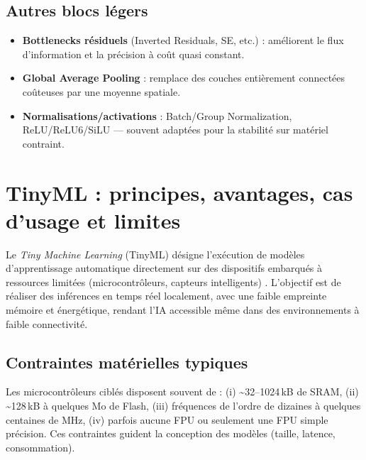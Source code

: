 \subsection{Autres blocs légers}
\begin{itemize}
    \item \textbf{Bottlenecks résiduels} (Inverted Residuals, SE, etc.) : améliorent le flux d’information et la précision à coût quasi constant.
    \item \textbf{Global Average Pooling} : remplace des couches entièrement connectées coûteuses par une moyenne spatiale.
    \item \textbf{Normalisations/activations} : Batch/Group Normalization, ReLU/ReLU6/SiLU — souvent adaptées pour la stabilité sur matériel contraint.
\end{itemize}

\section{TinyML : principes, avantages, cas d’usage et limites}
Le \textit{Tiny Machine Learning} (TinyML) désigne l’exécution de modèles d’apprentissage automatique directement sur des dispositifs embarqués à ressources limitées (microcontrôleurs, capteurs intelligents) \cite{banbury2021}. L’objectif est de réaliser des inférences en temps réel localement, avec une faible empreinte mémoire et énergétique, rendant l’IA accessible même dans des environnements à faible connectivité.

\subsection{Contraintes matérielles typiques}
Les microcontrôleurs ciblés disposent souvent de : (i) \textasciitilde32–1024\,kB de SRAM, (ii) \textasciitilde128\,kB à quelques Mo de Flash, (iii) fréquences de l’ordre de dizaines à quelques centaines de MHz, (iv) parfois aucune FPU ou seulement une FPU simple précision. Ces contraintes guident la conception des modèles (taille, latence, consommation).

